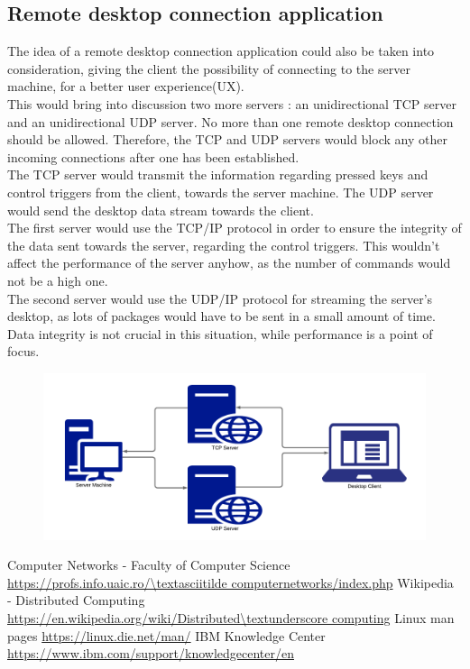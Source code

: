 \documentclass[runningheads]{llncs}
\begin{document}
\subsection{Remote desktop connection application}
The idea of a remote desktop connection application could also be taken into consideration, giving the client the possibility of connecting to the server machine, for a better user experience(UX).\\
This would bring into discussion two more servers : an unidirectional TCP server and an unidirectional UDP server. No more than one remote desktop connection should be allowed. Therefore, the TCP and UDP servers would block any other incoming connections after one has been established.\\
The TCP server would transmit the information regarding pressed keys and control triggers from the client, towards the server machine. The UDP server would send the desktop data stream towards the client.\\
The first server would use the TCP/IP protocol in order to ensure the integrity of the data sent towards the server, regarding the control triggers. This wouldn't affect the performance of the server anyhow, as the number of commands would not be a high one.\\
The second server would use the UDP/IP protocol for streaming the server's desktop, as lots of packages would have to be sent in a small amount of time. Data integrity is not crucial in this situation, while performance is a point of focus.\\
\begin{figure}[H]
\centering
\includegraphics[width=150mm]{RDC Network Diagram.png}
\end{figure}

\begin{thebibliography}{8}

\bibitem{}
Computer Networks - Faculty of Computer Science \url{https://profs.info.uaic.ro/\textasciitilde computernetworks/index.php}
\bibitem{}
Wikipedia - Distributed Computing \url{https://en.wikipedia.org/wiki/Distributed\textunderscore computing}
\bibitem{}
Linux man pages \url{https://linux.die.net/man/}
\bibitem{}
IBM Knowledge Center \url{https://www.ibm.com/support/knowledgecenter/en}

\end{thebibliography}
\end{document}
